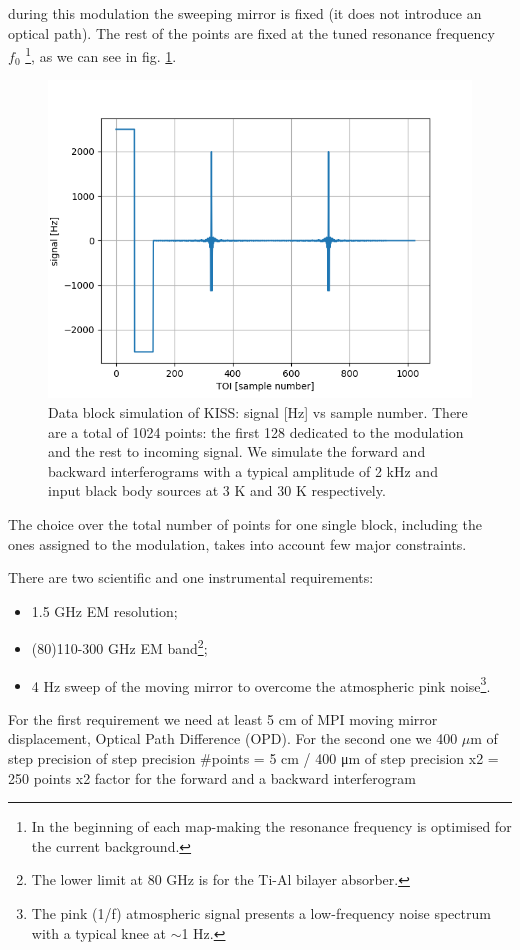 \documentclass[twocolumn,traditabstract]{aa}\\
\begin{document}
\noindent during this modulation the sweeping mirror is fixed (it does not introduce an optical path). The rest of the points are fixed at the tuned resonance frequency $f_0$ \footnote{In the beginning of each map-making the resonance frequency is optimised for the current background.}, as we can see in fig. \ref{fig:mod}.

\begin{figure}[htf]
	\centering
	\includegraphics[width=.5\textwidth]{3.acqui/block_data.png}
	\caption{Data block simulation of KISS: signal [Hz] vs sample number. There are a total of 1024 points: the first 128 dedicated to the modulation and the rest to incoming signal. We simulate the forward and backward interferograms with a typical amplitude of 2 kHz and input black body sources at 3 K and 30 K respectively.}
	\label{fig:mod}
\end{figure}

\noindent The choice over the total number of points for one single block, including the ones assigned to the modulation, takes into account few major constraints.

\noindent \color{red} There are two scientific and one instrumental requirements:

\begin{itemize}
	\item 1.5 GHz EM resolution;
	\item (80)110-300 GHz EM band\footnote{The lower limit at 80 GHz is for the Ti-Al bilayer absorber.};
	\item 4 Hz sweep of the moving mirror to overcome the atmospheric pink noise\footnote{The pink (1/f) atmospheric signal presents a low-frequency noise spectrum with a typical knee at $\sim$1 Hz.}.
\end{itemize}
\noindent
For the first requirement we need at least 5 cm of MPI moving mirror displacement, Optical Path Difference (OPD).
For the second one we  400 $\mu$m of step precision of step precision
#points = 5 cm / 400 μm of step precision x2 = 250 points
x2 factor for the forward and a backward interferogram
\end{document}

